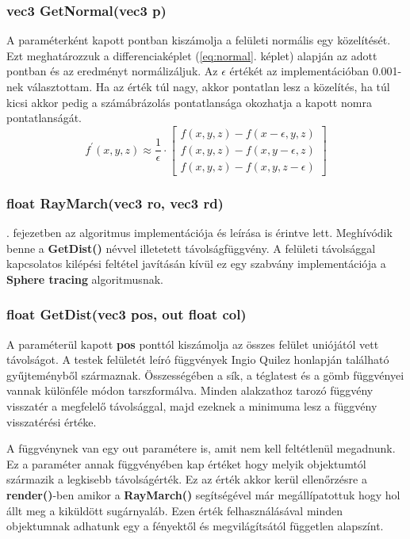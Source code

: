 \subsubsection{vec3 GetNormal(vec3 p)}
A paraméterként kapott pontban kiszámolja a felületi normális egy közelítését. Ezt meghatározzuk a differenciaképlet (\ref{eq:normal}. képlet) alapján az adott pontban és az eredményt normálizáljuk. Az \textbf{$\epsilon$} értékét az implementációban 0.001-nek választottam. Ha az érték túl nagy, akkor pontatlan lesz a közelítés, ha túl kicsi akkor pedig a számábrázolás pontatlansága okozhatja a kapott nomra pontatlanságát.
\begin{equation}
\label{eq:normal}
f^{\prime}(x, y, z)\approx\frac{1}{\epsilon} \cdot\left[\begin{array}{l}
f(x, y, z)-f(x-\epsilon, y, z) \\
f(x, y, z)-f(x, y-\epsilon, z) \\
f(x, y, z)-f(x, y, z-\epsilon)
\end{array}\right]
\end{equation}



\subsubsection{float RayMarch(vec3 ro, vec3 rd)}
. fejezetben az algoritmus implementációja és leírása is érintve lett. Meghívódik benne a \textbf{GetDist()} névvel illetetett távolságfüggvény. A felületi távolsággal kapcsolatos kilépési feltétel javításán kívül ez egy szabvány implementációja a \textbf{Sphere tracing} algoritmusnak.

\subsubsection{float GetDist(vec3 pos, out float col)}
A paraméterül kapott \textbf{pos} ponttól kiszámolja az összes felület uniójától vett távolságot. A testek felületét leíró függvények Ingio Quilez honlapján \cite{InigoQui87:online} található gyűjteményből származnak. Összességében a sík, a téglatest és a gömb függvényei vannak különféle módon tarszformálva. Minden alakzathoz tarozó függvény visszatér a megfelelő távolsággal, majd ezeknek a minimuma lesz a függvény visszatérési értéke. 

A függvénynek van egy out paramétere is, amit nem kell feltétlenül megadnunk. Ez a paraméter annak függvényében kap értéket hogy melyik objektumtól származik a legkisebb távolságérték. Ez az érték akkor kerül ellenőrzésre a \textbf{render()}-ben amikor a \textbf{RayMarch()} segítségével már megállípatottuk hogy hol állt meg a kiküldött sugárnyaláb. Ezen érték felhasználásával minden objektumnak adhatunk egy a fényektől és megvilágítsától független alapszínt.

